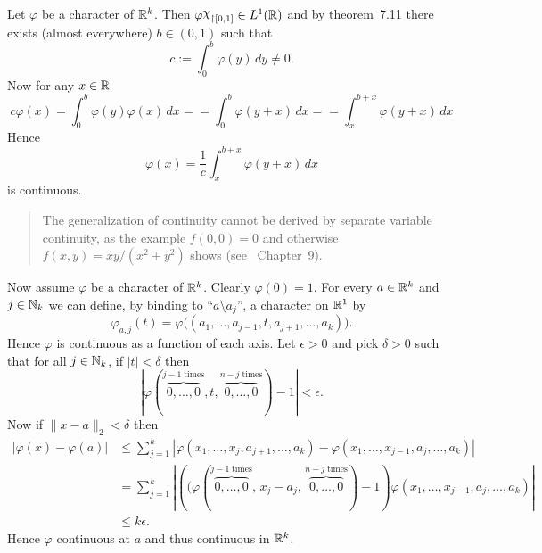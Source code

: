 \begin{enumerate}
Let \(\varphi\) be a character of \(\mathbb{R}^k\).
Then \(\varphi\chhi_{\restriction[0,1]}\in L^1(\R)\)
and by theorem~7.11 there exists (almost everywhere) \(b\in(0,1)\) such that
\begin{equation*}
c := \int_0^b \varphi(y)\,dy \neq 0.
\end{equation*}
Now for any \(x\in\mathbb{R}\)
\begin{equation*}
c \varphi(x) 
= \int_0^b \varphi(y)\varphi(x)\,dx = 
= \int_0^b \varphi(y + x)\,dx = 
= \int_x^{b+x} \varphi(y + x)\,dx
\end{equation*}
Hence 
\begin{equation*}
\varphi(x) = \frac{1}{c} \int_x^{b+x} \varphi(y + x)\,dx
\end{equation*}
is continuous.

\begin{quote}
The generalization of continuity cannot be derived
by separate variable continuity, as the example
\(f(0,0)=0\) and otherwise \(f(x,y)=xy/(x^2+y^2)\) shows
(see \cite{Gelb1996}~Chapter~9).
\end{quote}

Now assume \(\varphi\) be a character of \(\mathbb{R}^k\).
Clearly \(\varphi(0)=1\).
For every \(a\in \mathbb{R}^k\) and \(j\in\mathbb{N}_k\) we can define,
by binding to ``\(a \setminus a_j\)'',
a character on \(\mathbb{R}^1\) by
\begin{equation*}
\varphi_{a,j}(t) 
= \varphi\bigl((a_1,\ldots,a_{j-1},t,a_{j+1},\ldots,a_k)\bigr).
\end{equation*}
Hence \(\varphi\) is continuous as a function of each axis.
Let \(\epsilon>0\) and pick \(\delta>0\) such that
for all \(j\in \mathbb{N}_k\), if \(|t|<\delta\) then
\begin{equation*}
\left|\varphi\left(
   \overbrace{0,\ldots,0}^{j-1\;\textrm{times}},
   t,
   \overbrace{0,\ldots,0}^{n-j\;\textrm{times}}\right) - 1
\right| < \epsilon.
\end{equation*}
Now if \(\|x-a\|_2 < \delta\) then
\begin{align*}
|\varphi(x) - \varphi(a)|
&\leq \sum_{j=1}^k 
  \left|
   \varphi(x_1,\ldots        ,x_j,a_{j+1},\ldots,a_k)
   -
   \varphi(x_1,\ldots,x_{j-1},a_j,\ldots,a_k) \right| \\
&= \sum_{j=1}^k 
  \left|\left((\varphi\left(
           \overbrace{0,\ldots,0}^{j-1\;\textrm{times}},
           \,x_j - a_j,\,
           \overbrace{0,\ldots,0}^{n-j\;\textrm{times}}\right)
           - 1
        \right)
   \varphi(x_1,\ldots,x_{j-1},a_j,\ldots,a_k)\right| \\
&\leq k\epsilon.
\end{align*}
Hence \(\varphi\) continuous at $a$ and thus continuous in \(\mathbb{R}^k\).


\end{enumerate}
